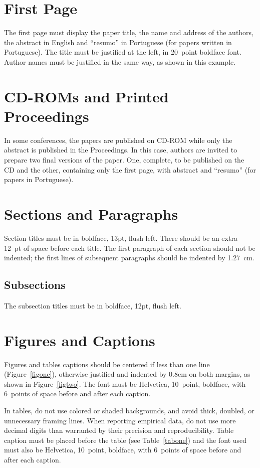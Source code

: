 \documentclass{SBCbookchapter}
\begin{document}
\section{First Page}
The first page must display the paper title, the name and address of
the authors, the abstract in English and ``resumo'' in Portuguese (for
papers written in Portuguese). The title must be justified at the
left, in 20~point boldface font. Author names must be justified in the
same way, as shown in this example.

\section{CD-ROMs and Printed Proceedings}
In some conferences, the papers are published on CD-ROM while only the
abstract is published in the Proceedings. In this case, authors are
invited to prepare two final versions of the paper. One, complete, to
be published on the CD and the other, containing only the first page,
with abstract and ``resumo'' (for papers in Portuguese).

\section{Sections and Paragraphs}
Section titles must be in boldface, 13pt, flush left. There should be
an extra 12~pt of space before each title. The first paragraph of each
section should not be indented; the first lines of subsequent
paragraphs should be indented by 1.27~cm.

\subsection{Subsections}
The subsection titles must be in boldface, 12pt, flush left.

\section{Figures and Captions}
\label{sec:captionmargins}
Figures and tables captions should be centered if less than one line
(Figure~\ref{figone}), otherwise justified and indented by 0.8cm on
both margins, as shown in Figure~\ref{figtwo}. The font must be
Helvetica, 10~point, boldface, with 6~points of space before and after
each caption.

In tables, do not use colored or shaded backgrounds, and avoid thick,
doubled, or unnecessary framing lines. When reporting empirical data,
do not use more decimal digits than warranted by their precision and
reproducibility. Table caption must be placed before the table (see
Table~\ref{tabone}) and the font used must also be Helvetica,
10~point, boldface, with 6~points of space before and after each
caption.
\end{document}
